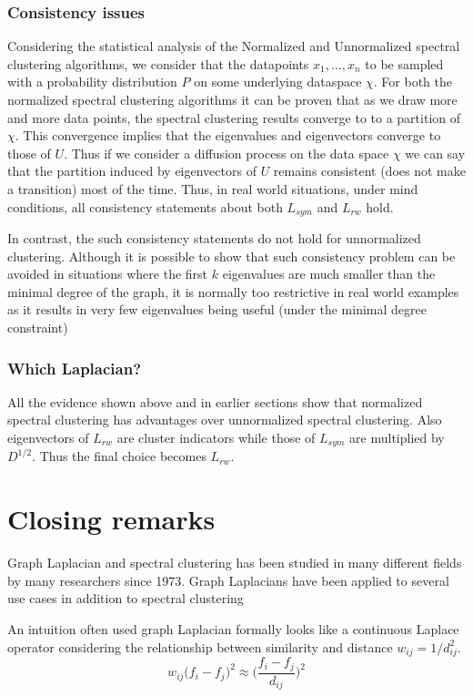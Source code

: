 \documentclass[10pt,a4paper, nocenter]{report}
\begin{document}
	\subsection{Consistency issues}
	Considering the statistical analysis of the Normalized and Unnormalized spectral clustering algorithms, we consider that the datapoints $x_{1},\dots,x_{n}$ to be sampled with a probability distribution $P$ on some underlying dataspace $\chi$. 
	For both the normalized spectral clustering algorithms it can be proven that as we draw more and more data points, the spectral clustering results converge to to a partition of $\chi$. This convergence implies that the eigenvalues and eigenvectors converge to those of $U$. Thus if we consider a diffusion process on the data space $\chi$ we can say that the partition induced by eigenvectors of $U$ remains consistent (does not make a transition) most of the time. Thus, in real world situations, under mind conditions, all consistency statements about both $L_{sym}$ and $L_{rw}$ hold. 
	
	In contrast, the such consistency statements do not hold for unnormalized clustering. Although it is possible to show that such consistency problem can be avoided in situations where the first $k$ eigenvalues are much smaller than the minimal degree of the graph, it is normally too restrictive in real world examples as it results in very few eigenvalues being useful (under the minimal degree constraint)
	
	\subsection{Which Laplacian?}
	 All the evidence shown above and in earlier sections show that normalized spectral clustering has advantages over unnormalized spectral clustering. Also eigenvectors of $L_{rw}$ are cluster indicators while those of $L_{sym}$ are multiplied by $D^{1/2}$. Thus the final choice becomes $L_{rw}$.
	 
	 
	 \chapter{Closing remarks}
	 Graph Laplacian and spectral clustering has been studied in many different fields by many researchers since 1973. Graph Laplacians have been applied to several use cases in addition to spectral clustering
	 
	 An intuition often used graph Laplacian formally looks like a continuous Laplace operator considering the relationship between similarity and distance $w_{ij} = 1/d_{ij}^{2}$. $$w_{ij}\big(f_{i}-f_{j}\big)^{2} \approx \bigg(\frac{f_{i}-f_{j}}{d_{ij}}\bigg)^{2}
	  $$ 
	 
\end{document}

